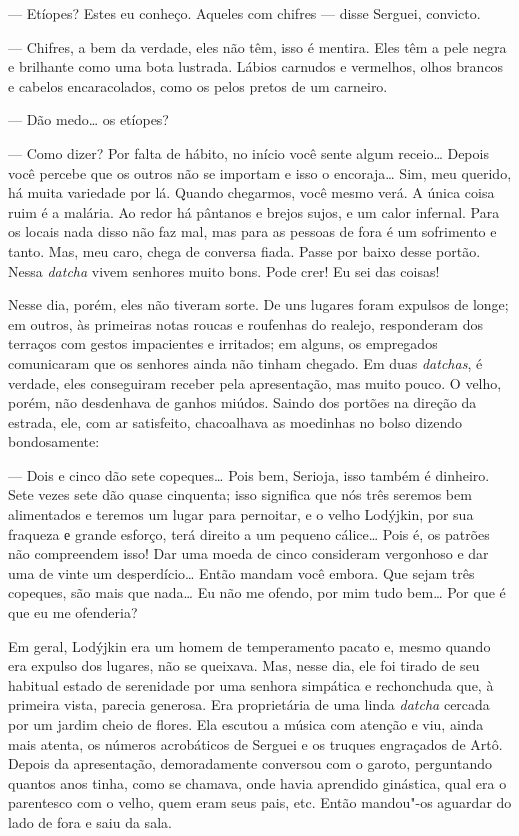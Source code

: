 --- Etíopes? Estes eu conheço. Aqueles com chifres --- disse Serguei,
convicto.

--- Chifres, a bem da verdade, eles não têm, isso é mentira. Eles têm a
pele negra e brilhante como uma bota lustrada. Lábios carnudos e
vermelhos, olhos brancos e cabelos encaracolados, como os pelos pretos
de um carneiro.

--- Dão medo\ldots{} os etíopes?

--- Como dizer? Por falta de hábito, no início você sente algum
receio\ldots{} Depois você percebe que os outros não se importam e isso o
encoraja\ldots{} Sim, meu querido, há muita variedade por lá. Quando
chegarmos, você mesmo verá. A única coisa ruim é a malária. Ao redor há
pântanos e brejos sujos, e um calor infernal. Para os locais nada disso
não faz mal, mas para as pessoas de fora é um sofrimento e tanto. Mas,
meu caro, chega de conversa fiada. Passe por baixo desse portão. Nessa
\emph{datcha} vivem senhores muito bons. Pode crer! Eu sei das coisas!

Nesse dia, porém, eles não tiveram sorte. De uns lugares foram expulsos
de longe; em outros, às primeiras notas roucas e roufenhas do realejo,
responderam dos terraços com gestos impacientes e irritados; em alguns,
os empregados comunicaram que os senhores ainda não tinham chegado. Em
duas \emph{datchas}, é verdade, eles conseguiram receber pela
apresentação, mas muito pouco. O velho, porém, não desdenhava de ganhos
miúdos. Saindo dos portões na direção da estrada, ele, com ar
satisfeito, chacoalhava as moedinhas no bolso dizendo bondosamente:

--- Dois e cinco dão sete copeques\ldots{} Pois bem, Serioja, isso também é
dinheiro. Sete vezes sete dão quase cinquenta; isso significa que nós
três seremos bem alimentados e teremos um lugar para pernoitar, e o
velho Lodýjkin, por sua fraqueza е grande esforço, terá direito a um
pequeno cálice\ldots{} Pois é, os patrões não compreendem isso! Dar uma moeda
de cinco consideram vergonhoso e dar uma de vinte um desperdício\ldots{}
Então mandam você embora. Que sejam três copeques, são mais que nada\ldots{}
Eu não me ofendo, por mim tudo bem\ldots{} Por que é que eu me ofenderia?

Em geral, Lodýjkin era um homem de temperamento pacato e, mesmo quando
era expulso dos lugares, não se queixava. Mas, nesse dia, ele foi tirado
de seu habitual estado de serenidade por uma senhora simpática e
rechonchuda que, à primeira vista, parecia generosa. Era proprietária de
uma linda \emph{datcha} cercada por um jardim cheio de flores. Ela
escutou a música com atenção e viu, ainda mais atenta, os números
acrobáticos de Serguei e os truques engraçados de Artô. Depois da
apresentação, demoradamente conversou com o garoto, perguntando quantos
anos tinha, como se chamava, onde havia aprendido ginástica, qual era o
parentesco com o velho, quem eram seus pais, etc. Então mandou"-os
aguardar do lado de fora e saiu da sala.

